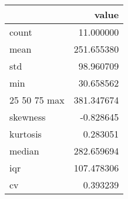 \begin{tabular}{lr}
\toprule
 & value \\
\midrule
count & 11.000000 \\
mean & 251.655380 \\
std & 98.960709 \\
min & 30.658562 \\
25%
50%
75%
max & 381.347674 \\
skewness & -0.828645 \\
kurtosis & 0.283051 \\
median & 282.659694 \\
iqr & 107.478306 \\
cv & 0.393239 \\
\bottomrule
\end{tabular}
